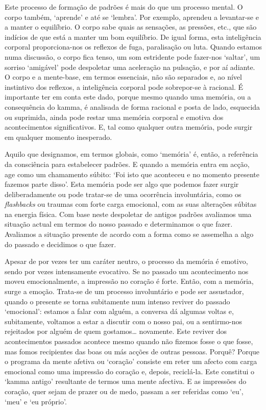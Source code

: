 Este processo de formação de padrões é mais do que um processo mental. O corpo
também, `aprende' e até se `lembra'. Por exemplo, aprendeu a levantar-se e a
manter o equilíbrio. O corpo sabe quais as sensações, as pressões, etc., que são
indícios de que está a manter um bom equilíbrio. De igual forma, esta
inteligência corporal proporciona-nos os reflexos de fuga, paralisação ou luta.
Quando estamos numa discussão, o corpo fica tenso, um som estridente pode
fazer-nos `saltar', um sorriso `amigável' pode despoletar uma aceleração na
pulsação, e por aí adiante. O corpo e a mente-base, em termos essenciais, não
são separados e, ao nível instintivo dos reflexos, a inteligência corporal pode
sobrepor-se à racional. É importante ter em conta este dado, porque mesmo quando
uma memória, ou a consequência do kamma, é analisada de forma racional e posta
de lado, esquecida ou suprimida, ainda pode restar uma memória corporal e
emotiva dos acontecimentos significativos. E, tal como qualquer outra memória,
pode surgir em qualquer momento inesperado.

Aquilo que designamos, em termos globais, como `memória' é, então, a referência
da consciência para estabelecer padrões. E quando a memória entra em acção, age
como um chamamento súbito: `Foi isto que aconteceu e no momento presente fazemos
parte disso'. Esta memória pode ser algo que podemos fazer surgir
deliberadamente ou pode tratar-se de uma ocorrência involuntária, como os
\emph{flashbacks} ou traumas com forte carga emocional, com as suas alterações
súbitas na energia física. Com base neste despoletar de antigos padrões
avaliamos uma situação actual em termos do nosso passado e determinamos o que
fazer. Avaliamos a situação presente de acordo com a forma como se assemelha a
algo do passado e decidimos o que fazer.

Apesar de por vezes ter um caráter neutro, o processo da memória é emotivo,
sendo por vezes intensamente evocativo. Se no passado um acontecimento nos moveu
emocionalmente, a impressão no coração é forte. Então, com a memória, surge a
emoção. Trata-se de um processo involuntário e pode ser assustador, quando o
presente se torna subitamente num intenso reviver do passado `emocional':
estamos a falar com alguém, a conversa dá algumas voltas e, subitamente,
voltamos a estar a discutir com o nosso pai, ou a sentirmo-nos rejeitados por
alguém de quem gostamos\ldots{} novamente. Este reviver dos acontecimentos passados
acontece mesmo quando não fizemos fosse o que fosse, mas fomos recipientes das
boas ou más acções de outras pessoas. Porquê? Porque o programa da mente afetiva
ou `coração' consiste em reter um afecto com carga emocional como uma impressão
do coração e, depois, reciclá-la. Este constitui o `kamma antigo' resultante de
termos uma mente afectiva. E as impressões do coração, quer sejam de prazer ou
de medo, passam a ser referidas como `eu', `meu' e `eu próprio'.

